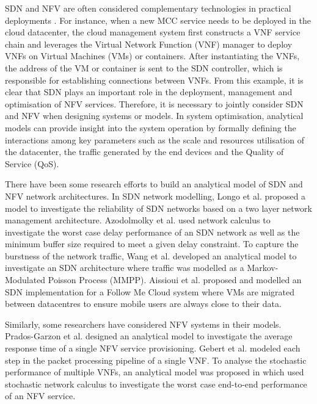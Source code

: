 SDN and NFV are often considered complementary technologies in practical deployments \cite{MatiasGTUJ15}. For instance, when a new MCC service needs to be deployed in the cloud datacenter, the cloud management system first constructs a VNF service chain and leverages the Virtual Network Function (VNF) manager to deploy VNFs on Virtual Machines (VMs) or containers. After instantiating the VNFs, the address of the VM or container is sent to the SDN controller, which is responsible for establishing connections between VNFs. From this example, it is clear that SDN plays an important role in the deployment, management and optimisation of NFV services. Therefore, it is necessary to jointly consider SDN and NFV when designing systems or models. In system optimisation, analytical models can provide insight into the system operation by formally defining the interactions among key parameters such as the scale and resources utilisation of the datacenter, the traffic generated by the end devices and the Quality of Service (QoS). 

There have been some research efforts to build an analytical model of SDN and NFV network architectures. In SDN network modelling, Longo et al. \cite{LongoDBS15} proposed a model to investigate the reliability of SDN networks based on a two layer network management architecture. Azodolmolky et al. \cite{AzodolmolkyWY13} used network calculus to investigate the worst case delay performance of an SDN network as well as the minimum buffer size required to meet a given delay constraint. To capture the burstness of the network traffic, Wang et al. \cite{MiaoMWWH16} developed an analytical model to investigate an SDN architecture where traffic was modelled as a Markov-Modulated Poisson Process (MMPP). Aissioui et al. \cite{AissiouiKGT15} proposed and modelled an SDN implementation for a Follow Me Cloud system where VMs are migrated between datacentres to ensure mobile users are always close to their data.

Similarly, some researchers have considered NFV systems in their models. Prados-Garzon et al. \cite{Prados-GarzonAR17} designed an analytical model to investigate the average response time of a single NFV service provisioning. Gebert et al. \cite{GebertZLST16} modeled each step in the packet processing pipeline of a single VNF. To analyse the stochastic performance of multiple VNFs, an analytical model was proposed in \cite{MiaoMWHZWL19} which used stochastic network calculus to investigate the worst case end-to-end performance of an NFV service. 

